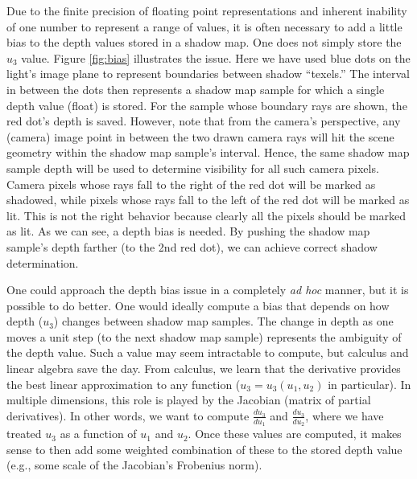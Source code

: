 \documentclass[]{article}  %
\begin{document}
Due to the finite precision of floating point representations and inherent inability of one number to represent a range of values, it is often necessary to add a little bias to the depth values stored in a shadow map.  One does not simply store the $u_3$ value.  Figure \ref{fig:bias} illustrates the issue.  Here we have used blue dots on the light's image plane to represent boundaries between shadow ``texels.''  The interval in between the dots then represents a shadow map sample for which a single depth value (float) is stored.  For the sample whose boundary rays are shown, the red dot's depth is saved.  However, note that from the camera's perspective, any (camera) image point in between the two drawn camera rays will hit the scene geometry within the shadow map sample's interval.  Hence, the same shadow map sample depth will be used to determine visibility for all such camera pixels.  Camera pixels whose rays fall to the right of the red dot will be marked as shadowed, while pixels whose rays fall to the left of the red dot will be marked as lit.  This is not the right behavior because clearly all the pixels should be marked as lit.  As we can see, a depth bias is needed.  By pushing the shadow map sample's depth farther (to the 2nd red dot), we can achieve correct shadow determination.  

One could approach the depth bias issue in a completely {\em ad hoc} manner, but it is possible to do better.  One would ideally compute a bias that depends on how depth ($u_3$) changes between shadow map samples.  The change in depth as one moves a unit step (to the next shadow map sample) represents the ambiguity of the depth value.  Such a value may seem intractable to compute, but calculus and linear algebra save the day.  From calculus, we learn that the derivative provides the best linear approximation to any function ($u_3 = u_3(u_1, u_2)$ in particular).  In multiple dimensions, this role is played by the Jacobian (matrix of partial derivatives).  In other words, we want to compute $\frac{du_3}{du_1}$ and $\frac{du_3}{du_2}$, where we have treated $u_3$ as a function of $u_1$ and $u_2$.  Once these values are computed, it makes sense to then add some weighted combination of these to the stored depth value (e.g., some scale of the Jacobian's Frobenius norm).  
\end{document}

